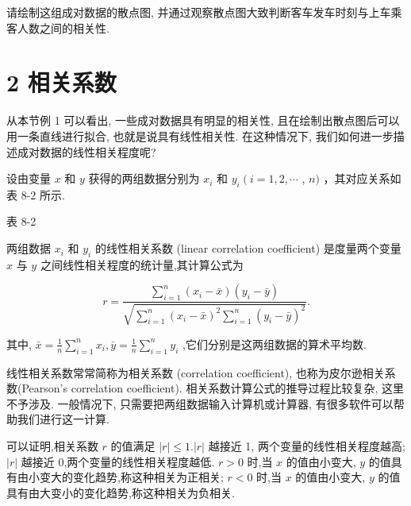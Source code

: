 \documentclass[10pt]{article}
\newcommand*\circled[1]{\tikz[baseline=(char.base)]{\node[shape=circle,draw,inner sep=1.5pt] (char) {\small #1};}}
\begin{document}
请绘制这组成对数据的散点图, 并通过观察散点图大致判断客车发车时刻与上车乘客人数之间的相关性.

\section*{2 相关系数}

从本节例 1 可以看出, 一些成对数据具有明显的相关性, 且在绘制出散点图后可以用一条直线进行拟合, 也就是说具有线性相关性. 在这种情况下, 我们如何进一步描述成对数据的线性相关程度呢?

设由变量 \(x\) 和 \(y\) 获得的两组数据分别为 \({x}_{i}\) 和 \({y}_{i}\left( {i = 1,2,\cdots }\right.\) , \(n)\) ，其对应关系如表 8-2 所示.

表 8-2

\begin{center}
\end{center}

两组数据 \({x}_{i}\) 和 \({y}_{i}\) 的线性相关系数 (linear correlation coefficient) 是度量两个变量 \(x\) 与 \(y\) 之间线性相关程度的统计量,其计算公式为

\[
r = \frac{\mathop{\sum }\limits_{{i = 1}}^{n}\left( {{x}_{i} - \bar{x}}\right) \left( {{y}_{i} - \bar{y}}\right) }{\sqrt{\mathop{\sum }\limits_{{i = 1}}^{n}{\left( {x}_{i} - \bar{x}\right) }^{2}\mathop{\sum }\limits_{{i = 1}}^{n}{\left( {y}_{i} - \bar{y}\right) }^{2}}}.
\]
  \circled{1} 

其中, \(\bar{x} = \frac{1}{n}\mathop{\sum }\limits_{{i = 1}}^{n}{x}_{i},\bar{y} = \frac{1}{n}\mathop{\sum }\limits_{{i = 1}}^{n}{y}_{i}\) ,它们分别是这两组数据的算术平均数.



线性相关系数常常简称为相关系数 (correlation coefficient), 也称为皮尔逊相关系数(Pearson's correlation coefficient). 相关系数计算公式的推导过程比较复杂, 这里不予涉及. 一般情况下, 只需要把两组数据输入计算机或计算器, 有很多软件可以帮助我们进行这一计算.

可以证明,相关系数 \(r\) 的值满足 \(\left| r\right|  \leq  1.\left| r\right|\) 越接近 1, 两个变量的线性相关程度越高; \(\left| r\right|\) 越接近 0,两个变量的线性相关程度越低. \(r > 0\) 时,当 \(x\) 的值由小变大, \(y\) 的值具有由小变大的变化趋势,称这种相关为正相关; \(r < 0\) 时,当 \(x\) 的值由小变大, \(y\) 的值具有由大变小的变化趋势,称这种相关为负相关.
\end{document}
